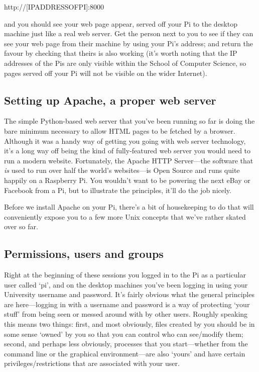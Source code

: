 \begin{ttoutenv}
http://[IPADDRESSOFPI]:8000
\end{ttoutenv}

and you should see your web page appear, served off your Pi to the desktop machine just like a real web server. Get the person next to you to see if they can see your web page from their machine by using your Pi's address; and return the favour by checking that theirs is also working (it's worth noting that the IP addresses of the Pis are only visible within the School of Computer Science, so pages served off your Pi will not be visible on the wider Internet).


\subsection{Setting up Apache, a proper web server}

The simple Python-based web server that you've been running so far is doing the bare minimum necessary to allow HTML pages to be fetched by a browser. Although it was a handy way of getting you going with web server technology, it's a long way off being the kind of fully-featured web server you would need to run a modern website. Fortunately, the Apache HTTP Server---the software that \textit{is} used to run over half the world's websites---is Open Source and runs quite happily on a Raspberry Pi. You wouldn't want to be powering the next eBay or Facebook from a Pi, but to illustrate the principles, it'll do the job nicely. 

Before we install Apache on your Pi, there's a bit of housekeeping to do that will conveniently expose you to a few more Unix concepts that we've rather skated over so far. 

\subsection{Permissions, users and groups}

Right at the beginning of these sessions you logged in to the Pi as a particular user called `pi', and on the desktop machines you've been logging in using your University username and password. It's fairly obvious what the general principles are here---logging in with a username and password is a way of protecting `your stuff' from being seen or messed around with by other users. Roughly speaking this means two things: first, and most obviously, files created by you should be in some sense `owned' by you so that you can control who can see/modify them; second, and perhaps less obviously, processes that you start---whether from the command line or the graphical environment---are also `yours' and have certain privileges/restrictions that are associated with your user. 


